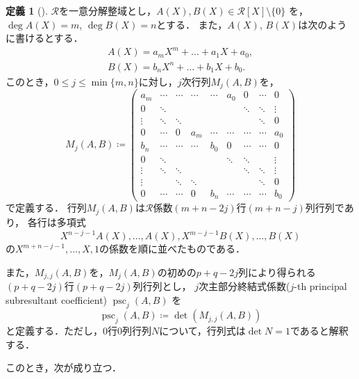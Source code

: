 \documentclass[uplatex, dvipdfmx]{jsarticle}
\numberwithin{equation}{section}
\DeclareMathOperator{\psc}{psc}
\theoremstyle{definition}
\newtheorem{definition}{定義}[section]
\begin{document}
\begin{definition}[{\cite[Section 2]{MR0403962}}]
     $\mathcal{R}$を一意分解整域とし，$A(X), B(X) \in \mathcal{R}[X] \setminus \{0\}$ を，$\deg A(X) = m$, $\deg B(X) = n$とする．
     また，$A(X)$, $B(X)$は次のように書けるとする．
     \begin{align}
          A(X) = a_m X^m + \dots + a_1 X + a_0, \\
          B(X) = b_n X^n + \dots + b_1 X + b_0.
     \end{align}
     このとき，$0 \leq j \leq \min\{m, n\}$に対し，$j$次行列$M_j(A, B)$を，
     \begin{equation}
          M_j(A, B) \coloneqq
          \begin{pmatrix}
               a_m    & \cdots & \cdots & \cdots & \cdots & a_0    & 0      & \cdots & 0      \\
               0      & \ddots &        &        &        &        & \ddots & \ddots & \vdots \\
               \vdots & \ddots & \ddots &        &        &        &        & \ddots & 0      \\
               0      & \cdots & 0      & a_m    & \cdots & \cdots & \cdots & \cdots & a_0    \\
               b_n    & \cdots & \cdots & \cdots & b_0    & 0      & \cdots & \cdots & 0      \\
               0      & \ddots &        &        &        & \ddots & \ddots &        & \vdots \\
               \vdots & \ddots & \ddots &        &        &        & \ddots & \ddots & \vdots \\
               \vdots &        & \ddots & \ddots &        &        &        & \ddots & 0      \\
               0      & \cdots & \cdots & 0      & b_n    & \cdots & \cdots & \cdots & b_0      
          \end{pmatrix}
     \end{equation}
     で定義する．
     行列$M_j(A,B)$は$\mathcal{R}$係数$(m+n-2j)$行$(m+n-j)$列行列であり，
     各行は多項式
     \begin{equation}
          X^{n-j-1}A(X), \dots, A(X), X^{m-j-1}B(X), \dots, B(X)
     \end{equation}
     の$X^{m+n-j-1}, \dots, X, 1$の係数を順に並べたものである．

     また，$M_{j,j}(A,B)$を，$M_j(A,B)$の初めの$p+q-2j$列により得られる$(p+q-2j)$行$(p+q-2j)$列行列とし，
     $j$次主部分終結式係数($j$-th principal subresultant coefficient) $\psc_j(A,B)$ を
     \begin{equation}
          \psc_j(A,B) \coloneqq \det(M_{j,j}(A,B))
     \end{equation}
     と定義する．ただし，$0$行$0$列行列$N$について，行列式は$\det N = 1$であると解釈する．
\end{definition}
このとき，次が成り立つ．
\end{document}

